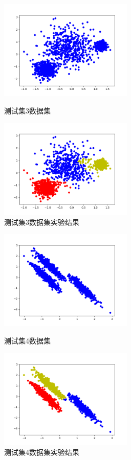 \documentclass{article}
\begin{document}
   \begin{figure}[!ht]
\centering
    \begin{minipage}[c]{0.5\textwidth}
        \centering
      \includegraphics[width=2.5in]{ds3}
      \caption{测试集3数据集}\label{aa}
    \end{minipage}%
    \begin{minipage}[c]{0.5\textwidth}
        \centering
      \includegraphics[width=2.5in]{ds32}
      \caption{测试集3数据集实验结果}\label{aa}
    \end{minipage}
\end{figure}



   \begin{figure}[!ht]
\centering
    \begin{minipage}[c]{0.5\textwidth}
        \centering
      \includegraphics[width=2.5in]{ds4}
      \caption{测试集4数据集}\label{aa}
    \end{minipage}%
    \begin{minipage}[c]{0.5\textwidth}
        \centering
      \includegraphics[width=2.5in]{ds42}
      \caption{测试集4数据集实验结果}\label{aa}
    \end{minipage}
\end{figure}
\end{document}
